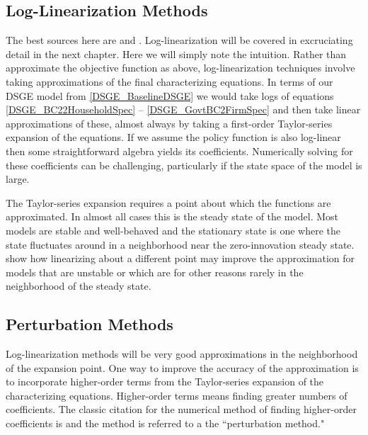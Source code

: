 \documentclass[letterpaper,12pt]{article}
\theoremstyle{definition}
\begin{document}
\begin{spacing}{1.5}
	\subsection{Log-Linearization Methods}\label{LogLinSol}
		The best sources here are \citet{Uhlig1999} and \citet{Christiano2002}.  Log-linearization will be covered in excruciating detail in the next chapter.  Here we will simply note the intuition.  Rather than approximate the objective function as above, log-linearization techniques involve taking approximations of the final characterizing equations.  In terms of our DSGE model from \ref{DSGE_BaselineDSGE} we would take logs of equations \eqref{DSGE_BC22HouseholdSpec} -- \eqref{DSGE_GovtBC2FirmSpec} and then take linear approximations of these, almost always by taking a first-order Taylor-series expansion of the equations.  If we assume the policy function is also log-linear then some straightforward algebra yields its coefficients.  Numerically solving for these coefficients can be challenging, particularly if the state space of the model is large.

		The Taylor-series expansion requires a point about which the functions are approximated.  In almost all cases this is the steady state of the model.  Most models are stable and well-behaved and the stationary state is one where the state fluctuates around in a neighborhood near the zero-innovation steady state.  \citet{EvansPhillips2014} show how linearizing about a different point may improve the approximation for models that are unstable or which are for other reasons rarely in the neighborhood of the steady state.

	\subsection{Perturbation Methods}\label{PertSol}
		Log-linearization methods will be very good approximations in the neighborhood of the expansion point.  One way to improve the accuracy of the approximation is to incorporate higher-order terms from the Taylor-series expansion of the characterizing equations.  Higher-order terms means finding greater numbers of coefficients.  The classic citation for the numerical method of finding higher-order coefficients is \citet{Judd1992} and the method is referred to a the ``perturbation method."


\end{spacing}
\end{document}
